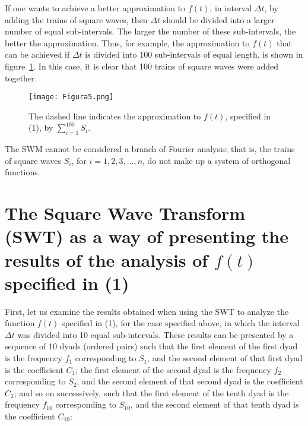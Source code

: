 \documentclass[11pt]{rMTA2010} \usepackage[utf8]{inputenc} \usepackage{graphicx} \usepackage{booktabs} \usepackage{array} \usepackage{enumerate}
\begin{document}
If one wants to achieve a better approximation to $f(t)$, in interval $\Delta t$, by adding the trains of square waves, then $\Delta t$ should be divided into a larger number of equal sub-intervals. The larger the number of these sub-intervals, the better the approximation. Thus, for example, the approximation to $f(t)$ that can be achieved if $\Delta t$ is divided into 100 sub-intervals of equal length, is shown in figure~\ref{f5}. In this case, it is clear that 100 trains of square waves were added together.

\begin{figure}[H]
\centering
\texttt{[image: Figura5.png]}
\caption{The dashed line indicates the approximation to $f(t)$, specified in (1), by $\displaystyle\sum\limits_{i=1}^{100}S_ i$.}
\label{f5}
\end{figure}

The SWM cannot be considered a branch of Fourier analysis; that is, the trains of square waves $S_i$, for $i = 1, 2, 3,\dots, n$, do not make up a system of orthogonal functions.

\section{The Square Wave Transform (SWT) as a way of presenting the results of the analysis of $f(t)$ specified in (1)}

First, let us examine the results obtained when using the SWT to analyze the function $f(t)$ specified in (1), for the case specified above, in which the interval $\Delta t$ was divided into 10 equal sub-intervals. These results can be presented by a sequence of 10 dyads (ordered pairs) such that the first element of the first dyad is the frequency $f_1$ corresponding to $S_1$, and the second element of that first dyad is the coefficient $C_1$; the first element of the second dyad is the frequency $f_2$ corresponding to $S_2$, and the second element of that second dyad is the coefficient $C_2$; and so on successively, such that the first element of the tenth dyad is the frequency $f_{10}$ corresponding to $S_{10}$, and the second element of that tenth dyad is the coefficient $C_{10}$:
\end{document}
